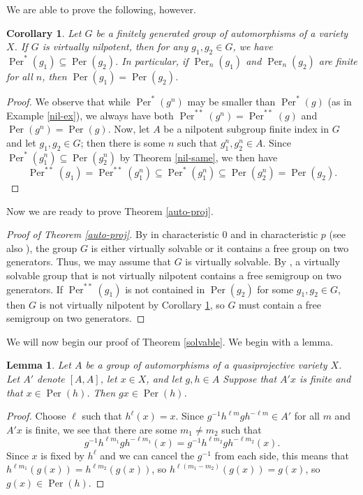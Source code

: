 \documentclass{amsart}
\DeclareMathOperator{\Per}{Per}
\newtheorem{lem}[thm]{Lemma}
\newtheorem{cor}[thm]{Corollary}
\theoremstyle{definition}
\begin{document}
We are able to prove the following, however.

\begin{cor}\label{ns2}
  Let $G$ be a finitely generated group of automorphisms of a variety
  $X$.  If $G$ is virtually nilpotent, then for any
  $g_1, g_2 \in G$, we have $\Per^{*}(g_1) \subseteq \Per(g_2)$.  In
  particular, if $\Per_n(g_1)$  and $\Per_n(g_2)$ are finite for all
  $n$, then $\Per(g_1) = \Per(g_2)$.  
 \end{cor}
 \begin{proof}
   We observe that while $\Per^*(g^n)$ may
   be smaller than $\Per^*(g)$ (as in Example \ref{nil-ex}), we always
   have both $\Per^{**}(g^n) = \Per^{**}(g)$ and $\Per(g^n) = \Per(g)$.
   Now, let $A$ be a nilpotent subgroup finite index in $G$ and let
   $g_1, g_2 \in G$; then there is some $n$ such that
   $g_1^n, g_2^n \in A$.  Since
   $\Per^{*}(g_1^n) \subseteq \Per(g_2^n)$ by Theorem \ref{nil-same},
   we then have
 \[ \Per^{**}(g_1) = \Per^{**}(g_1^n) \subseteq \Per^{*}(g_1^n) \subseteq
 \Per(g_2^n) = \Per(g_2). \]

   
 \end{proof}

 Now we are ready to prove Theorem \ref{auto-proj}.  
 \begin{proof}[Proof of Theorem \ref{auto-proj}]
   By \cite[Theorem 1.1]{Tits-Var-Z} in characteristic 0 and
   \cite[Theorem 1.1]{Hu} in characteristic $p$ (see also
   \cite{Tits-Var}), the group $G$ is either virtually solvable or it
   contains a free group on two generators.  Thus, we may assume that
   $G$ is virtually solvable.  By \cite[Theorems 4.2 and
   4.7]{Rosenblatt}, a virtually solvable group that is not virtually
   nilpotent contains a free semigroup on two generators.  If
   $\Per^{**}(g_1)$ is not contained in $\Per(g_2)$ for some
   $g_1, g_2 \in G$, then $G$ is not virtually nilpotent by Corollary
   \ref{ns2}, so $G$ must contain a free semigroup on two generators.
 \end{proof}

 We will now begin our proof of Theorem \ref{solvable}. We begin with a lemma.

 \begin{lem}\label{commutator}
   Let $A$ be a group of automorphisms of a quasiprojective variety
   $X$.  Let $A'$ denote $[A,A]$, let $x \in X$, and let $g,h \in A$
   Suppose that $A'x$ is finite and that $x \in \Per(h)$.  Then $gx
   \in \Per(h)$.  
 \end{lem}
 \begin{proof}
 Choose $\ell$ such that $h^\ell(x) = x$.  Since $g^{-1} h^{\ell m} g
 h^{-\ell m}  \in A'$ for all $m$ and $A'x$ is finite, we see that
 there are some $m_1 \not= m_2$ such that
 \[ g^{-1} h^{\ell m_1} g h^{-\ell m_1} (x) =  g^{-1} h^{\ell m_2} g
   h^{-\ell m_2} (x).\]
 Since $x$ is fixed by $h^\ell$ and we can cancel the $g^{-1}$ from
 each side, this means that $h^{\ell m_1}(g(x)) = h^{\ell
   m_2}(g(x))$, so $h^{\ell (m_1 - m_2)}(g(x)) = g(x)$, so $g(x) \in
 \Per(h)$.  
\end{proof}
\end{document}
